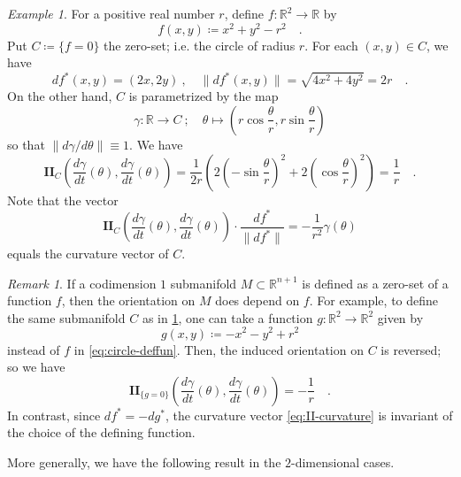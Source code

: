 \documentclass[pdftex,a4paper,12pt]{scrartcl}
\theoremstyle{plain}
\theoremstyle{definition}
\theoremstyle{remark}
\newtheorem{example}[theorem]{Example}
\newtheorem{remark}[theorem]{Remark}
\begin{document}
\begin{example}
\label{ex:II-on-circle}
For a positive real number $r$, define $f:\mathbb R^2\to\mathbb R$ by
\begin{equation}
\label{eq:circle-deffun}
f(x,y)\coloneqq x^2+y^2-r^2
\quad.
\end{equation}
Put $C\coloneqq\{f=0\}$ the zero-set; i.e. the circle of radius $r$.
For each $(x,y)\in C$, we have
\[
df^\ast(x,y) = (2x,2y)
\ ,\quad
\|df^\ast(x,y)\| = \sqrt{4x^2 + 4y^2} = 2r
\quad.
\]
On the other hand, $C$ is parametrized by the map
\[
\gamma:\mathbb R\to C
\ ;\quad \theta\mapsto \left(r\cos\frac\theta{r},r\sin\frac\theta{r}\right)
\]
so that $\|d\gamma/d\theta\|\equiv 1$.
We have
\[
\mathbf{II}_C\left(\frac{d\gamma}{dt}(\theta),\frac{d\gamma}{dt}(\theta)\right)
= \frac1{2r}\left(2\left(-\sin\frac\theta{r}\right)^2 + 2\left(\cos\frac\theta{r}\right)^2\right) = \frac1{r}
\quad.
\]
Note that the vector
\begin{equation}
\label{eq:II-curvature}
\mathbf{II}_C\left(\frac{d\gamma}{dt}(\theta),\frac{d\gamma}{dt}(\theta)\right)\cdot \frac{df^\ast}{\|df^\ast\|}
= -\frac{1}{r^2}\gamma(\theta)
\end{equation}
equals the curvature vector of $C$.
\end{example}

\begin{remark}
If a codimension $1$ submanifold $M\subset\mathbb R^{n+1}$ is defined as a zero-set of a function $f$, then the orientation on $M$ does depend on $f$.
For example, to define the same submanifold $C$ as in \cref{ex:II-on-circle}, one can take a function $g:\mathbb R^2\to\mathbb R^2$ given by
\[
g(x,y)\coloneqq -x^2-y^2+r^2
\]
instead of $f$ in \eqref{eq:circle-deffun}.
Then, the induced orientation on $C$ is reversed; so we have
\[
\mathbf{II}_{\{g=0\}}\left(\frac{d\gamma}{dt}(\theta),\frac{d\gamma}{dt}(\theta)\right)
= -\frac1{r}
\quad.
\]
In contrast, since $df^\ast = -dg^\ast$, the curvature vector \eqref{eq:II-curvature} is invariant of the choice of the defining function.
\end{remark}

More generally, we have the following result in the $2$-dimensional cases.
\end{document}
